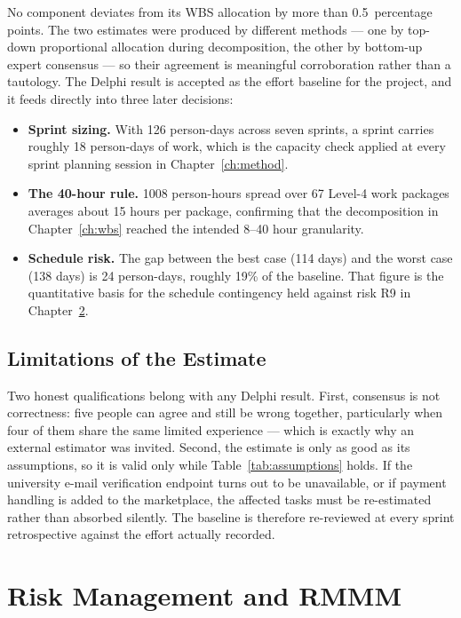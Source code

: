 \documentclass[11pt,a4paper]{report}
\begin{document}
No component deviates from its WBS allocation by more than
0.5~percentage points. The two estimates were produced by different
methods --- one by top-down proportional allocation during decomposition, the
other by bottom-up expert consensus --- so their agreement is meaningful
corroboration rather than a tautology. The Delphi result is accepted as the
effort baseline for the project, and it feeds directly into three later decisions:

\begin{itemize}
  \item \textbf{Sprint sizing.} With 126 person-days across seven sprints, a
  sprint carries roughly 18 person-days of work, which is the capacity check
  applied at every sprint planning session in Chapter~\ref{ch:method}.
  \item \textbf{The 40-hour rule.} 1008 person-hours spread over 67 Level-4
  work packages averages about 15 hours per package, confirming that the
  decomposition in Chapter~\ref{ch:wbs} reached the intended 8--40 hour
  granularity.
  \item \textbf{Schedule risk.} The gap between the best case (114 days) and
  the worst case (138 days) is 24 person-days, roughly 19\% of the
  baseline. That figure is the quantitative basis for the schedule contingency
  held against risk R9 in Chapter~\ref{ch:risk}.
\end{itemize}

\section{Limitations of the Estimate}

Two honest qualifications belong with any Delphi result. First, consensus is not
correctness: five people can agree and still be wrong together, particularly when
four of them share the same limited experience --- which is exactly why an
external estimator was invited. Second, the estimate is only as good as its
assumptions, so it is valid only while Table~\ref{tab:assumptions} holds. If the
university e-mail verification endpoint turns out to be unavailable, or if payment
handling is added to the marketplace, the affected tasks must be re-estimated
rather than absorbed silently. The baseline is therefore re-reviewed at every
sprint retrospective against the effort actually recorded.

\chapter{Risk Management and RMMM}
\label{ch:risk}
\end{document}
